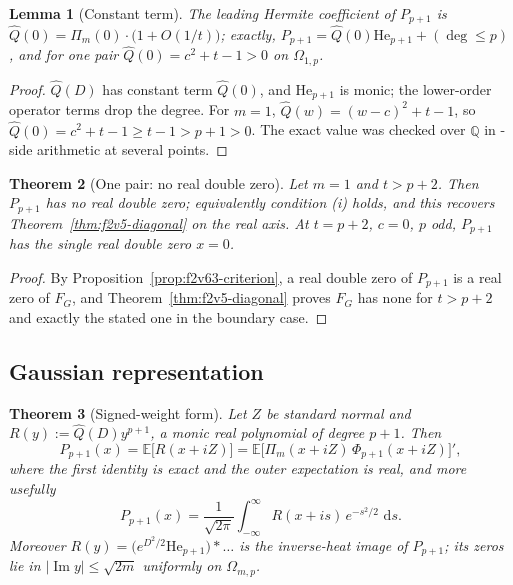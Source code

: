 \documentclass[11pt]{article}
\newtheorem{theorem}{Theorem}[section]
\newtheorem{lemma}[theorem]{Lemma}
\theoremstyle{definition}
\theoremstyle{remark}
\newcommand{\dd}{\,\mathrm d}
\begin{document}
\begin{lemma}[Constant term]
\label{lem:f2v63-const}
The leading Hermite coefficient of \(P_{p+1}\) is
\(\widehat Q(0)=\Pi_m(0)\cdot\bigl(1+O(1/t)\bigr)\); exactly,
\(P_{p+1}=\widehat Q(0)\mathrm{He}_{p+1}+(\deg\le p)\), and for one pair
\(\widehat Q(0)=c^2+t-1>0\) on \(\Omega_{1,p}\).
\end{lemma}

\begin{proof}
\(\widehat Q(D)\) has constant term \(\widehat Q(0)\), and
\(\mathrm{He}_{p+1}\) is monic; the lower-order operator terms drop the
degree.  For \(m=1\), \(\widehat Q(w)=(w-c)^2+t-1\), so
\(\widehat Q(0)=c^2+t-1\ge t-1>p+1>0\).  The exact value was checked over
\(\mathbb Q\) in -side arithmetic at several points.
\end{proof}

\begin{theorem}[One pair: no real double zero]
\label{thm:f2v63-onepair}
Let \(m=1\) and \(t>p+2\).  Then \(P_{p+1}\) has no real double zero;
equivalently condition \textup{(i)} holds, and this recovers
Theorem~\ref{thm:f2v5-diagonal} on the real axis.  At \(t=p+2\), \(c=0\),
\(p\) odd, \(P_{p+1}\) has the single real double zero \(x=0\).
\end{theorem}

\begin{proof}
By Proposition~\ref{prop:f2v63-criterion}, a real double zero of
\(P_{p+1}\) is a real zero of \(F_G\), and
Theorem~\ref{thm:f2v5-diagonal} proves \(F_G\) has none for \(t>p+2\)
and exactly the stated one in the boundary case.
\end{proof}

\subsection{Gaussian representation}

\begin{theorem}[Signed-weight form]
\label{thm:f2v63-gaussian}
Let \(Z\) be standard normal and \(R(y):=\widehat Q(D)y^{p+1}\), a monic
real polynomial of degree \(p+1\).  Then
\begin{equation}
 P_{p+1}(x)=\mathbb E\bigl[R(x+iZ)\bigr]
 =\mathbb E\bigl[\Pi_m(x+iZ)\,\Phi_{p+1}(x+iZ)\bigr]',
 \label{eq:f2v63-gauss}
\end{equation}
where the first identity is exact and the outer expectation is real, and
more usefully
\begin{equation}
 P_{p+1}(x)=\frac{1}{\sqrt{2\pi}}\int_{-\infty}^{\infty}
 R(x+is)\,e^{-s^2/2}\,\dd s .
 \label{eq:f2v63-int}
\end{equation}
Moreover \(R(y)=\bigl(e^{D^2/2}\mathrm{He}_{p+1}\bigr)\ast\ldots\) is the
inverse-heat image of \(P_{p+1}\); its zeros lie in
\(|\operatorname{Im}y|\le\sqrt{2m}\) uniformly on \(\Omega_{m,p}\).
\end{theorem}
\end{document}
